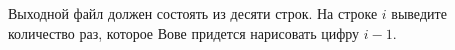 Выходной файл должен состоять из десяти строк. На строке $i$ выведите количество раз, которое Вове придется нарисовать цифру $i - 1$.
